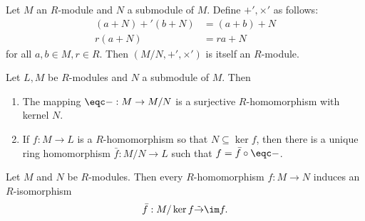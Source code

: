 \documentclass{article}
\begin{document}
\begin{theorem}[Notes 3.7.31]
    Let $M$ an $R$-module and $N$ a submodule of $M$. Define $+',\times'$ as follows:
    \begin{align*}
        (a+N)+'(b+N) &= (a+b)+N\\
        r(a+N) &= ra + N 
    \end{align*}
    for all $a,b\in M,r\in R$. Then $(M/N,+',\times')$ is itself an $R$-module.
\end{theorem}

\begin{theorem}[Notes 3.7.32]
    Let $L,M$ be $R$-modules and $N$ a submodule of $M$. Then
    \begin{enumerate}
        \item The mapping $\eqc - : M\to M/N$ is a surjective $R$-homomorphism with kernel $N$.
        \item If $f:M\to L$ is a $R$-homomorphism so that $N\subseteq\ker f$, then there 
            is a unique ring homomorphism $\bar f:M/N\to L$ such that $f=\bar f\circ\eqc -$.
    \end{enumerate} 
\end{theorem}

\begin{theorem}
    Let $M$ and $N$ be $R$-modules. Then every $R$-homomorphism $f:M\to N$ induces an $R$-isomorphism
    \begin{align*}
        \bar f:M/\ker f \tilde\to \im f.
    \end{align*} 
\end{theorem}
\end{document}
